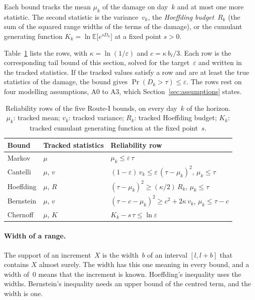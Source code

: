 \documentclass[11pt,a4paper]{article}
\theoremstyle{plain}
\theoremstyle{definition}
\theoremstyle{remark}
\begin{document}
Each bound tracks the mean $\mu_k$ of the damage on day~$k$ and at most one more statistic.
The second statistic is the variance~$v_k$, the \emph{Hoeffding budget}~$R_k$ (the sum of the squared range widths of the terms of the damage), or the cumulant generating function $K_k = \ln\mathbb{E}\bigl[e^{sD_k}\bigr]$ at a fixed point $s > 0$.

Table~\ref{tab:five_bounds} lists the rows, with $\kappa = \ln(1/\varepsilon)$ and $c = \kappa\, b_\ell/3$.
Each row is the corresponding tail bound of this section, solved for the target~$\varepsilon$ and written in the tracked statistics.
If the tracked values satisfy a row and are at least the true statistics of the damage, the bound gives $\Pr(D_k > \tau) \le \varepsilon$.
The rows rest on four modelling assumptions, A0 to A3, which Section~\ref{sec:assumptions} states.

\begin{table}[htbp]
\centering
\caption{Reliability rows of the five Route-I bounds, on every day~$k$ of the horizon.
$\mu_k$: tracked mean; $v_k$: tracked variance; $R_k$: tracked Hoeffding budget; $K_k$: tracked cumulant generating function at the fixed point~$s$.}
\label{tab:five_bounds}
\small
\begin{tabular}{@{}lll@{}}
\toprule
\rowcolor{headgrey}
\textbf{Bound} & \textbf{Tracked statistics} & \textbf{Reliability row} \\
\midrule
Markov    & $\mu$       & $\mu_k \le \varepsilon\,\tau$ \\
Cantelli  & $\mu$, $v$  & $(1-\varepsilon)\,v_k \le \varepsilon\,(\tau - \mu_k)^2$, \quad $\mu_k \le \tau$ \\
Hoeffding & $\mu$, $R$  & $(\tau - \mu_k)^2 \ge (\kappa/2)\,R_k$, \quad $\mu_k \le \tau$ \\
Bernstein & $\mu$, $v$  & $(\tau - c - \mu_k)^2 \ge c^2 + 2\kappa\, v_k$, \quad $\mu_k \le \tau - c$ \\
Chernoff  & $\mu$, $K$  & $K_k - s\,\tau \le \ln\varepsilon$ \\
\bottomrule
\end{tabular}
\end{table}

\paragraph{Width of a range.}
The support of an increment~$X$ is the width~$b$ of an interval $[l, l + b]$ that contains $X$ almost surely.
The width has this one meaning in every bound, and a width of~$0$ means that the increment is known.
Hoeffding's inequality uses the widths.
Bernstein's inequality needs an upper bound of the centred term, and the width is one.
\end{document}
